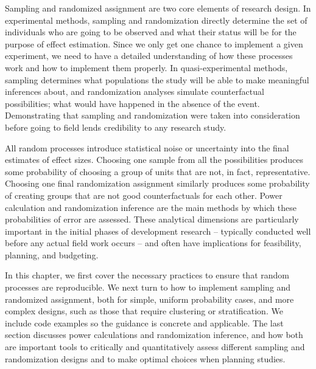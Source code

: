 
\begin{fullwidth}
	Sampling and randomized assignment are two core elements of research design.
	In experimental methods, sampling and randomization directly determine
	the set of individuals who are going to be observed
	and what their status will be for the purpose of effect estimation.
	Since we only get one chance to implement a given experiment,
	we need to have a detailed understanding of how these processes work
	and how to implement them properly.
	In quasi-experimental methods, sampling determines what populations the study
	will be able to make meaningful inferences about,
	and randomization analyses simulate counterfactual possibilities;
	what would have happened in the absence of the event.
	Demonstrating that sampling and randomization were taken into consideration
	before going to field lends credibility to any research study.
	
	All random processes introduce statistical noise
	or uncertainty into the final estimates of effect sizes.
	Choosing one sample from all the possibilities produces some probability of
	choosing a group of units that are not, in fact, representative.
	Choosing one final randomization assignment similarly produces some probability of
	creating groups that are not good counterfactuals for each other.
	Power calculation and randomization inference
	are the main methods by which these probabilities of error are assessed.
	These analytical dimensions are particularly important in the initial phases of development research --
	typically conducted well before any actual field work occurs --
	and often have implications for feasibility, planning, and budgeting.
	
	In this chapter, we first cover the necessary practices to ensure that random processes are reproducible.
	We next turn to how to implement sampling and randomized assignment,
	both for simple, uniform probability cases, and more complex designs,
	such as those that require clustering or stratification.
	We include code examples so the guidance is concrete and applicable.
	The last section discusses power calculations and randomization inference,
	and how both are important tools to critically and quantitatively assess different
	sampling and randomization designs and to make optimal choices when planning studies.
	
	
\end{fullwidth}


